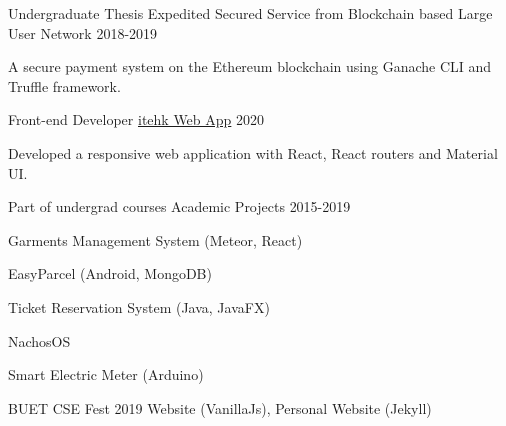 

\begin{cventries}

  \cventry
    {Undergraduate Thesis} %
    {Expedited Secured Service from Blockchain based Large User Network} %
    {} %
    {2018-2019} %
    {
      \begin{cvitems} %
        \item {A secure payment system on the Ethereum blockchain using Ganache CLI and Truffle framework.}
      \end{cvitems}
    }

  \cventry
    {Front-end Developer} %
    {\href{https://itehk.co}{itehk Web App}} %
    {} %
    {2020} %
    {
      \begin{cvitems} %
        \item {Developed a responsive web application with React, React routers and Material UI.}
      \end{cvitems}
    }

  \cventry
    {Part of undergrad courses} %
    {Academic Projects} %
    {} %
    {2015-2019} %
    {
      \begin{cvitems} %
        \item {Garments Management System (Meteor, React)}
        \item {EasyParcel (Android, MongoDB)}
        \item { Ticket Reservation System (Java, JavaFX)}
        \item {NachosOS}
        \item {Smart Electric Meter (Arduino)}
        \item {BUET CSE Fest 2019 Website (VanillaJs), Personal Website (Jekyll)}
      \end{cvitems}
    }


\end{cventries}
